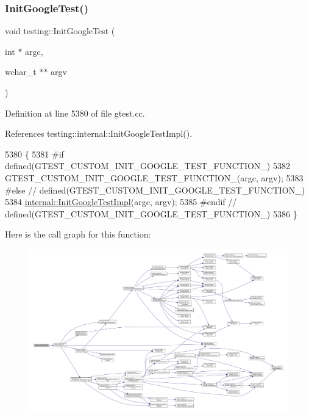 \subsubsection{\texorpdfstring{Init\+Google\+Test()}{InitGoogleTest()}\hspace{0.1cm}{\footnotesize\ttfamily [2/2]}}
{\footnotesize\ttfamily void testing\+::\+Init\+Google\+Test (\begin{DoxyParamCaption}\item[{int $\ast$}]{argc,  }\item[{wchar\+\_\+t $\ast$$\ast$}]{argv }\end{DoxyParamCaption})}



Definition at line 5380 of file gtest.\+cc.



References testing\+::internal\+::\+Init\+Google\+Test\+Impl().


\begin{DoxyCode}
5380                                                \{
5381 \textcolor{preprocessor}{#if defined(GTEST\_CUSTOM\_INIT\_GOOGLE\_TEST\_FUNCTION\_)}
5382   GTEST\_CUSTOM\_INIT\_GOOGLE\_TEST\_FUNCTION\_(argc, argv);
5383 \textcolor{preprocessor}{#else  // defined(GTEST\_CUSTOM\_INIT\_GOOGLE\_TEST\_FUNCTION\_)}
5384   \hyperlink{namespacetesting_1_1internal_ac3c6fa93391768aa91c6238b31aaeeb5}{internal::InitGoogleTestImpl}(argc, argv);
5385 \textcolor{preprocessor}{#endif  // defined(GTEST\_CUSTOM\_INIT\_GOOGLE\_TEST\_FUNCTION\_)}
5386 \}
\end{DoxyCode}
Here is the call graph for this function\+:
\nopagebreak
\begin{figure}[H]
\begin{center}
\leavevmode
\includegraphics[width=350pt]{namespacetesting_ae5a88709a4a7529e30c83242156556b3_cgraph}
\end{center}
\end{figure}
\mbox{\label{namespacetesting_a12aebaf8363d49a383047529f798b694}} 
